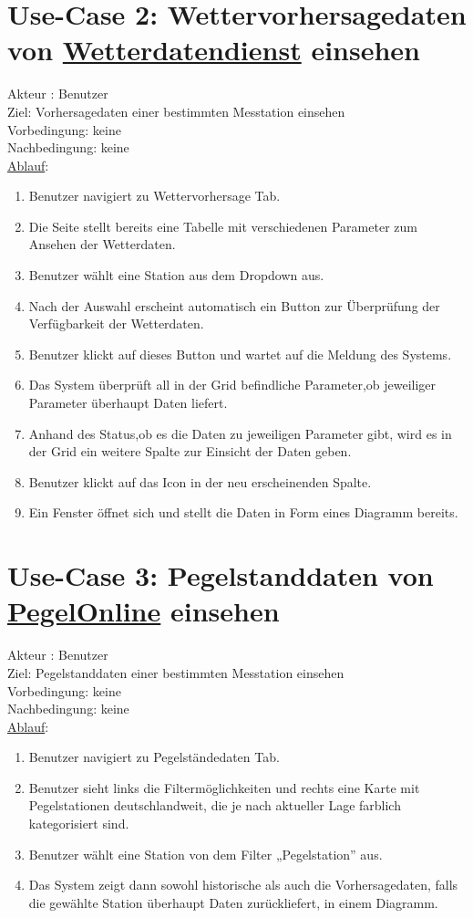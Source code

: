 \documentclass[a4paper,12pt]{scrreprt}
\begin{document}
\section*{\small \textbf{Use-Case 2: Wettervorhersagedaten von \href{https://wetterdienst.readthedocs.io/en/latest/} {Wetterdatendienst} einsehen}}
Akteur : Benutzer\\
Ziel:  Vorhersagedaten einer bestimmten Messtation einsehen\\
Vorbedingung: keine\\
Nachbedingung: keine\\
\underline{Ablauf}:
\begin{enumerate}
\item Benutzer navigiert zu  Wettervorhersage Tab.
\item Die Seite stellt bereits eine Tabelle mit verschiedenen Parameter zum Ansehen der Wetterdaten.
\item Benutzer wählt eine Station aus dem Dropdown aus.
\item Nach der Auswahl erscheint automatisch ein Button zur Überprüfung der Verfügbarkeit der Wetterdaten.
\item Benutzer klickt auf dieses Button und wartet auf die Meldung des Systems.
\item Das System überprüft all in der Grid befindliche Parameter,ob jeweiliger Parameter überhaupt Daten liefert. 
\item Anhand des Status,ob es die Daten zu jeweiligen Parameter gibt, wird es in der Grid ein weitere Spalte zur Einsicht der Daten geben. 
\item Benutzer klickt auf das Icon in der neu erscheinenden Spalte.
\item Ein Fenster öffnet sich und stellt die Daten in Form eines Diagramm bereits. 
\end{enumerate}
\section*{\small \textbf{Use-Case 3: Pegelstanddaten von \href{https://www.pegelonline.wsv.de/gast/start} {PegelOnline} einsehen}}
Akteur : Benutzer\\
Ziel:  Pegelstanddaten einer bestimmten Messtation einsehen\\
Vorbedingung: keine\\
Nachbedingung: keine\\
\underline{Ablauf}:
\begin{enumerate}
\item Benutzer navigiert zu Pegelständedaten Tab.
\item Benutzer sieht links die Filtermöglichkeiten und rechts eine Karte mit Pegelstationen deutschlandweit, die je nach aktueller Lage farblich kategorisiert sind.
\item Benutzer wählt eine Station von dem Filter „Pegelstation” aus.
\item Das System zeigt dann sowohl historische als auch die Vorhersagedaten, falls die gewählte Station überhaupt Daten zurückliefert, in einem Diagramm.
\end{enumerate}
\end{document}
